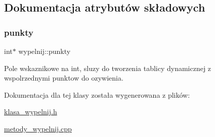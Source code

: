 \subsection{Dokumentacja atrybutów składowych}
\mbox{\label{classwypelnij_a31de55fdeeb16737abb02d089ab339e8}} 
\subsubsection{\texorpdfstring{punkty}{punkty}}
{\footnotesize\ttfamily int$\ast$ wypelnij\+::punkty\hspace{0.3cm}{\ttfamily [protected]}}

Pole wskaznikowe na int, sluzy do tworzenia tablicy dynamicznej z wspolrzednymi punktow do ozywienia. 

Dokumentacja dla tej klasy została wygenerowana z plików\+:\begin{DoxyCompactItemize}
\item 
\mbox{\hyperlink{klasa__wypelnij_8h}{klasa\+\_\+wypelnij.\+h}}\item 
\mbox{\hyperlink{metody__wypelnij_8cpp}{metody\+\_\+wypelnij.\+cpp}}\end{DoxyCompactItemize}
